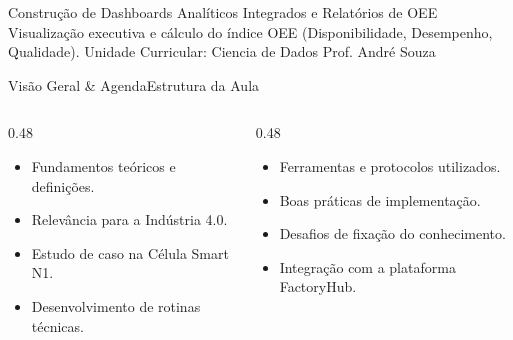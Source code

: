 
\senaicover
  {Construção de Dashboards Analíticos Integrados e Relatórios de OEE}
  {Visualização executiva e cálculo do índice OEE (Disponibilidade, Desempenho, Qualidade).}
  {Unidade Curricular: Ciencia de Dados}
  {Prof. André Souza}

\begin{senaiframe}{Visão Geral \& Agenda}{Estrutura da Aula}
  \begin{columns}[t]
    \begin{column}{0.48\textwidth}
      \begin{tcolorbox}[senaibluecard, title={1. Conceitos Chave}]
        \begin{itemize}
          \item Fundamentos teóricos e definições.
          \item Relevância para a Indústria 4.0.
        \end{itemize}
      \end{tcolorbox}
      \vspace{4pt}
      \begin{tcolorbox}[senaiambercard, title={3. Aplicação Prática}]
        \begin{itemize}
          \item Estudo de caso na Célula Smart N1.
          \item Desenvolvimento de rotinas técnicas.
        \end{itemize}
      \end{tcolorbox}
    \end{column}
    \begin{column}{0.48\textwidth}
      \begin{tcolorbox}[senairedcard, title={2. Detalhamento Técnico}]
        \begin{itemize}
          \item Ferramentas e protocolos utilizados.
          \item Boas práticas de implementação.
        \end{itemize}
      \end{tcolorbox}
      \vspace{4pt}
      \begin{tcolorbox}[senaigreencard, title={4. Exercícios \& Avaliação}]
        \begin{itemize}
          \item Desafios de fixação do conhecimento.
          \item Integração com a plataforma FactoryHub.
        \end{itemize}
      \end{tcolorbox}
    \end{column}
  \end{columns}
\end{senaiframe}

